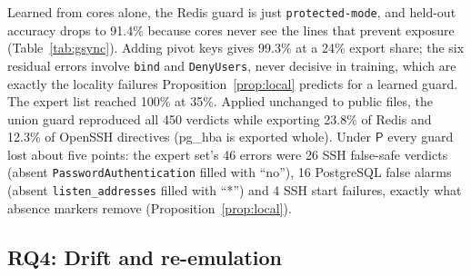 \documentclass[conference]{IEEEtran}
\newcommand{\Pb}{\mathsf{P}}
\newcommand{\RQ}[1]{\textbf{RQ#1}}
\begin{document}
Learned from cores alone, the Redis guard is just \texttt{protected-mode}, and held-out accuracy drops to 91.4\% because cores never see the lines that prevent exposure (Table~\ref{tab:gsync}). Adding pivot keys gives 99.3\% at a 24\% export share; the six residual errors involve \texttt{bind} and \texttt{DenyUsers}, never decisive in training, which are exactly the locality failures Proposition~\ref{prop:local} predicts for a learned guard. The expert list reached 100\% at 35\%. Applied unchanged to public files, the union guard reproduced all 450 verdicts while exporting 23.8\% of Redis and 12.3\% of OpenSSH directives (pg\_hba is exported whole). Under $\Pb$ every guard lost about five points: the expert set's 46 errors were 26 SSH false-safe verdicts (absent \texttt{PasswordAuthentication} filled with ``no''), 16 PostgreSQL false alarms (absent \texttt{listen\_addresses} filled with ``*'') and 4 SSH start failures, exactly what absence markers remove (Proposition~\ref{prop:local}).

\subsection{\RQ{4}: Drift and re-emulation}
\end{document}
